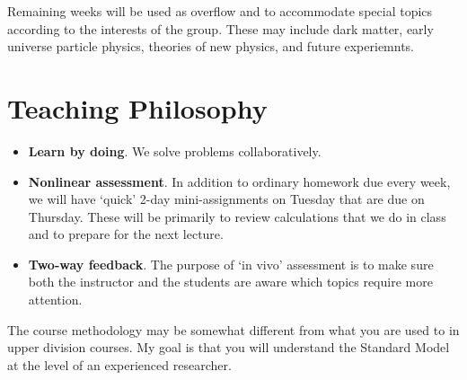 \documentclass[12pt]{article}
\numberwithin{equation}{section}    %
\begin{document}
\noindent Remaining weeks will be used as overflow and to accommodate special topics according to the interests of the group. These may include dark matter, early universe particle physics, theories of new physics, and future experiemnts.




\section*{Teaching Philosophy}

\begin{itemize}
	\item \textbf{Learn by doing}. We solve problems collaboratively.
	\item \textbf{Nonlinear assessment}. In addition to ordinary homework due every week, we will have `quick' 2-day mini-assignments on Tuesday that are due on Thursday. These will be primarily to review calculations that we do in class and to prepare for the next lecture.
	\item \textbf{Two-way feedback}. The purpose of `in vivo' assessment is to make sure both the instructor and the students are aware which topics require more attention.
\end{itemize}

\noindent The course methodology may be somewhat different from what you are used to in upper division courses. My goal is that you will understand the Standard Model at the level of an experienced researcher.
\end{document}
